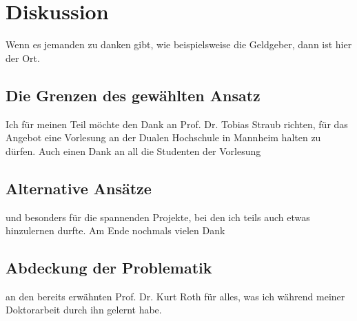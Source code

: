 \section{Diskussion}

Wenn es jemanden zu danken gibt, wie beispielsweise die Geldgeber, 
dann ist hier der Ort.

\subsection{Die Grenzen des gewählten Ansatz}

Ich für meinen Teil möchte den Dank an Prof. Dr. Tobias Straub
richten, für das Angebot eine Vorlesung an der Dualen Hochschule in
Mannheim halten zu dürfen. Auch einen Dank an all die Studenten der Vorlesung

\subsection{Alternative Ansätze}

und besonders für die spannenden Projekte, bei den ich teils auch 
etwas hinzulernen durfte. Am Ende nochmals vielen Dank 

\subsection{Abdeckung der Problematik}

an den bereits erwähnten Prof. Dr. Kurt Roth für alles, 
was ich während meiner Doktorarbeit durch ihn gelernt habe.
